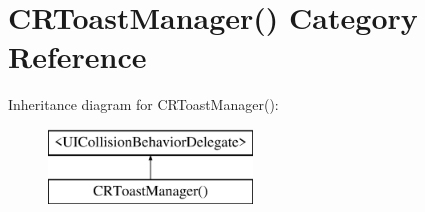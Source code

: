 \hypertarget{category_c_r_toast_manager_07_08}{}\section{C\+R\+Toast\+Manager() Category Reference}
\label{category_c_r_toast_manager_07_08}
Inheritance diagram for C\+R\+Toast\+Manager()\+:\begin{figure}[H]
\begin{center}
\leavevmode
\includegraphics[height=2.000000cm]{category_c_r_toast_manager_07_08}
\end{center}
\end{figure}

